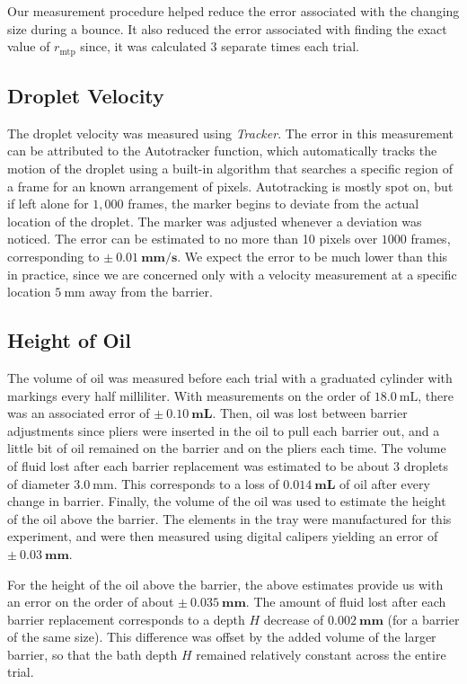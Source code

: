 Our measurement procedure helped reduce the error associated with the changing size during a bounce. It also reduced the error associated with finding the exact value of $r_\mathrm{mtp}$ since, it was calculated 3 separate times each trial.

    \subsection{Droplet Velocity}
The droplet velocity was measured using \textit{Tracker}. The error in this measurement can be attributed to the Autotracker function, which automatically tracks the motion of the droplet using a built-in algorithm that searches a specific region of a frame for an known arrangement of pixels. Autotracking is mostly spot on, but if left alone for $1,000$ frames, the marker begins to deviate from the actual location of the droplet. The marker was adjusted whenever a deviation was noticed. The error can be estimated to no more than 10 pixels over $1000$ frames, corresponding to $\mathbf{\pm~0.01~\mathrm{\textbf{mm/s}}}$. We expect the error to be much lower than this in practice, since we are concerned only with a velocity measurement at a specific location $5~\mathrm{mm}$ away from the barrier.

    \subsection{Height of Oil}
The volume of oil was measured before each trial with a graduated cylinder with markings every half milliliter. With measurements on the order of $18.0~\mathrm{mL}$, there was an associated error of $\mathbf{\pm~0.10~\mathrm{\textbf{mL}}}$. Then, oil was lost between barrier adjustments since pliers were inserted in the oil to pull each barrier out, and a little bit of oil remained on the barrier and on the pliers each time. The volume of fluid lost after each barrier replacement was estimated to be about 3 droplets of diameter $3.0~\mathrm{mm}$. This corresponds to a loss of $\mathbf{0.014~\mathrm{\textbf{mL}}}$ of oil after every change in barrier. Finally, the volume of the oil was used to estimate the height of the oil above the barrier. The elements in the tray were manufactured for this experiment, and were then measured using digital calipers yielding an error of $\mathbf{\pm~0.03~\mathrm{\textbf{mm}}}$. 

For the height of the oil above the barrier, the above estimates provide us with an error on the order of about $\mathbf{\pm~0.035~\mathrm{\textbf{mm}}}$. The amount of fluid lost after each barrier replacement corresponds to a depth $H$ decrease of $\mathbf{0.002~\mathrm{\textbf{mm}}}$ (for a barrier of the same size). This difference was offset by the added volume of the larger barrier, so that the bath depth $H$ remained relatively constant across the entire trial. 

